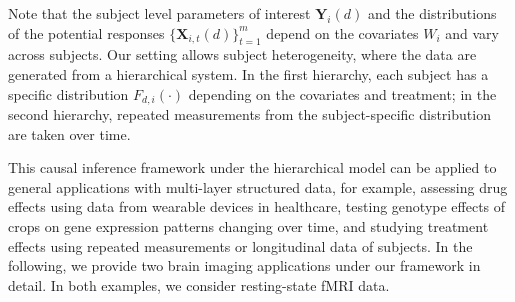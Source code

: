 \documentclass[12pt]{article}
\def\be{\begin{equation}}
\def\ee{\end{equation}}
\def\T{{ \mathrm{\scriptscriptstyle T} }}
\theoremstyle{definition}
\newcommand{\E}{\rm E}
\newcommand{\bX}{{\mathbf X}}
\newcommand{\bY}{{\mathbf Y}}
\newcommand{\btau}{\boldsymbol{\tau}}
\begin{document}
Note that the subject level parameters of interest $\bY_{i}(d)$ and the distributions of the potential responses $\{\bX_{i, t}(d)\}_{t =1}^{m}$ depend on the covariates $W_{i}$ and vary across subjects. 
Our setting allows subject heterogeneity, where the data are generated from a hierarchical system. In the first hierarchy, each subject has a specific distribution $F_{d, i}(\cdot)$ depending on the covariates and treatment; 
in the second hierarchy, repeated measurements from the subject-specific distribution are taken over time. 
%

This causal inference framework under the hierarchical model can be applied to general applications with multi-layer structured data, for example, assessing drug effects using data from wearable devices in healthcare, testing genotype effects of crops on gene expression patterns changing over time, 
and studying treatment effects using repeated measurements or longitudinal data of subjects. 
In the following, we provide two brain imaging applications under our framework in detail.
In both examples, we consider resting-state fMRI data. 
\end{document}
